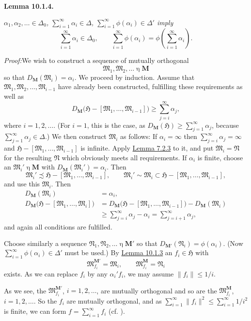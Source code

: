 \documentclass[12pt,b5paper,twoside]{article}
\newcommand{\Hspace}{\mathfrak H}
\newcommand{\M}{\mathbf M}
\newcommand{\Lemma}[1]{%
  \par\smallskip\noindent\phantomsection\label{lem:#1}\textbf{Lemma #1.}\enspace
}
\newcommand{\Proof}{\par\noindent\textit{Proof:}\enspace}
\newcommand{\lemref}[1]{\hyperref[lem:#1]{Lemma #1}}
\begin{document}
\Lemma{10.1.4}
{\itshape
$\alpha_1,\alpha_2,\ldots\in\Delta_0$,
$\sum_{i=1}^{\infty}\alpha_i\in\Delta$,
$\sum_{i=1}^{\infty}\phi(\alpha_i)\in\Delta'$ imply
\[
 \sum_{i=1}^{\infty}\alpha_i\in\Delta_0,
 \qquad
 \sum_{i=1}^{\infty}\phi(\alpha_i)
 =\phi\left(\sum_{i=1}^{\infty}\alpha_i\right).
\]}

\Proof We wish to construct a sequence of mutually orthogonal
\[
 \mathfrak M_1,\mathfrak M_2,\ldots\mathbin\eta\M
\]
so that $D_{\M}(\mathfrak M_i)=\alpha_i$. We proceed by induction. Assume
that $\mathfrak M_1,\mathfrak M_2,\ldots,\mathfrak M_{i-1}$ have already
been constructed, fulfilling these requirements as well as
\[
 D_{\M}\bigl(\Hspace-[\mathfrak M_1,\ldots,\mathfrak M_{i-1}]\bigr)
 \geq\sum_{j=i}^{\infty}\alpha_j,
\]
where $i=1,2,\ldots$. (For $i=1$, this is the case, as
$D_{\M}(\Hspace)\geq\sum_{j=1}^{\infty}\alpha_j$, because
$\sum_{j=1}^{\infty}\alpha_j\in\Delta$.) We then construct
$\mathfrak M_i$ as follows: If $\alpha_i=\infty$ then
$\sum_{j=i}^{\infty}\alpha_j=\infty$ and
$\Hspace-[\mathfrak M_1,\ldots,\mathfrak M_{i-1}]$ is infinite. Apply
\lemref{7.2.3} to it, and put $\mathfrak M_i=\mathfrak N$ for the resulting
$\mathfrak N$ which obviously meets all requirements. If $\alpha_i$ is
finite, choose an $\mathfrak M_i'\mathbin\eta\M$ with
$D_{\M}(\mathfrak M_i')=\alpha_i$. Then
\[
 \mathfrak M_i'\precsim
 \Hspace-[\mathfrak M_1,\ldots,\mathfrak M_{i-1}],
 \qquad
 \mathfrak M_i'\sim\mathfrak M_i\subset
 \Hspace-[\mathfrak M_1,\ldots,\mathfrak M_{i-1}],
\]
and use this $\mathfrak M_i$. Then
\begin{align*}
 D_{\M}(\mathfrak M_i)&=\alpha_i,\\
 D_{\M}\bigl(\Hspace-[\mathfrak M_1,\ldots,\mathfrak M_i]\bigr)
 &=D_{\M}\bigl(\Hspace-[\mathfrak M_1,\ldots,\mathfrak M_{i-1}]\bigr)
   -D_{\M}(\mathfrak M_i)\\
 &\geq\sum_{j=i}^{\infty}\alpha_j-\alpha_i
   =\sum_{j=i+1}^{\infty}\alpha_j,
\end{align*}
and again all conditions are fulfilled.

Choose similarly a sequence
$\mathfrak N_1,\mathfrak N_2,\ldots\mathbin\eta\M'$ so that
$D_{\M'}(\mathfrak N_i)=\phi(\alpha_i)$. (Now
$\sum_{i=1}^{\infty}\phi(\alpha_i)\in\Delta'$ must be used.) By
\lemref{10.1.3} an $f_i\in\Hspace$ with
\[
 \mathfrak M_{f_i}^{\M'}=\mathfrak M_i,
 \qquad \mathfrak M_{f_i}^{\M}=\mathfrak N_i
\]
exists. As we can replace $f_i$ by any $\alpha_i'f_i$, we may assume
$\lVert f_i\rVert\leq1/i$.

As we see, the $\mathfrak M_{f_i}^{\M'}$, $i=1,2,\ldots$, are mutually
orthogonal and so are the $\mathfrak M_{f_i}^{\M}$,
$i=1,2,\ldots$. So the $f_i$ are mutually orthogonal, and as
$\sum_{i=1}^{\infty}\lVert f_i\rVert^2\leq
\sum_{i=1}^{\infty}1/i^2$ is finite, we can form
$f=\sum_{i=1}^{\infty}f_i$ (cf. \cite[p.~67]{ref16}).
\end{document}
